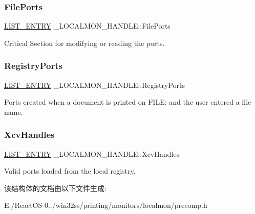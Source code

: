 \subsubsection{\texorpdfstring{File\+Ports}{FilePorts}}
{\footnotesize\ttfamily \hyperlink{struct___l_i_s_t___e_n_t_r_y}{L\+I\+S\+T\+\_\+\+E\+N\+T\+RY} \+\_\+\+L\+O\+C\+A\+L\+M\+O\+N\+\_\+\+H\+A\+N\+D\+L\+E\+::\+File\+Ports}

Critical Section for modifying or reading the ports. \mbox{\label{struct___l_o_c_a_l_m_o_n___h_a_n_d_l_e_ac370a8e8cffe08f0a45a2a78cbdd1fbb}} 
\subsubsection{\texorpdfstring{Registry\+Ports}{RegistryPorts}}
{\footnotesize\ttfamily \hyperlink{struct___l_i_s_t___e_n_t_r_y}{L\+I\+S\+T\+\_\+\+E\+N\+T\+RY} \+\_\+\+L\+O\+C\+A\+L\+M\+O\+N\+\_\+\+H\+A\+N\+D\+L\+E\+::\+Registry\+Ports}

Ports created when a document is printed on F\+I\+LE\+: and the user entered a file name. \mbox{\label{struct___l_o_c_a_l_m_o_n___h_a_n_d_l_e_a50daf3d5878ddecb7e9b7d0e3e83724b}} 
\subsubsection{\texorpdfstring{Xcv\+Handles}{XcvHandles}}
{\footnotesize\ttfamily \hyperlink{struct___l_i_s_t___e_n_t_r_y}{L\+I\+S\+T\+\_\+\+E\+N\+T\+RY} \+\_\+\+L\+O\+C\+A\+L\+M\+O\+N\+\_\+\+H\+A\+N\+D\+L\+E\+::\+Xcv\+Handles}

Valid ports loaded from the local registry. 

该结构体的文档由以下文件生成\+:\begin{DoxyCompactItemize}
\item 
E\+:/\+React\+O\+S-\/0../win32ss/printing/monitors/localmon/precomp.\+h\end{DoxyCompactItemize}
